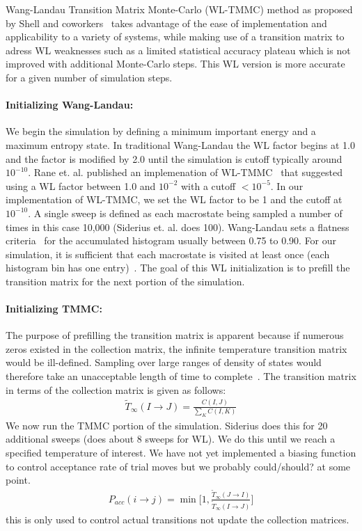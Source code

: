 \documentclass[letterpaper,twocolumn,amsmath,amssymb,pre,aps,10pt]{revtex4-1}
\begin{document}
Wang-Landau Transition Matrix Monte-Carlo (WL-TMMC) method as proposed
by Shell and coworkers~\cite{shell2003improved,shell2004flat} takes
advantage of the ease of implementation and applicability to a variety
of systems, while making use of a transition matrix to adress WL
weaknesses such as a limited statistical accuracy plateau which is not
improved with additional Monte-Carlo steps.  This WL version is more
accurate for a given number of simulation steps.

\paragraph{Initializing Wang-Landau:} We begin the simulation by
defining a minimum important energy and a maximum entropy state. In
traditional Wang-Landau the WL factor begins at 1.0 and the factor is
modified by 2.0 until the simulation is cutoff typically around
$10^{-10}$.  Rane et. al. published an implemenation of
WL-TMMC~\cite{rane2013monte} that suggested using a WL factor between 1.0 and
$10^{-2}$ with a cutoff $<10^{-5}$. In our implementation of WL-TMMC,
we set the WL factor to be 1 and the cutoff at $10^{-10}$. A single
sweep is defined as each macrostate being sampled a number of times in
this case 10,000 (Siderius et. al. does 100). Wang-Landau sets a
flatness criteria~\cite{wang2001determining, wang2001efficient,
hatch2015computational, mahynski2017predicting} for the accumulated
histogram usually between 0.75 to 0.90.  For our simulation, it is
sufficient that each macrostate is visited at least once (each
histogram bin has one entry)~\cite{shell2003improved}.  The goal of
this WL initialization is to prefill the transition matrix for the next
portion of the simulation.
\paragraph{Initializing TMMC:} The purpose of prefilling the transition
matrix is apparent because if numerous zeros existed in the collection
matrix, the infinite temperature transition matrix would be
ill-defined.  Sampling over large ranges of density of states would
therefore take an unacceptable length of time to
complete~\cite{shell2003improved, shen2014elucidating}.  The transition
matrix in terms of the collection matrix is given as follows:
\begin{align}
\widetilde{T}_{\infty}(I\rightarrow J) = \frac{C(I,J)}
{\sum_{K} C(I,K)}
\end{align}
We now run the TMMC portion of the simulation.  Siderius does this for
20 additional sweeps (does about 8 sweeps for WL).  We do this until we
reach a specified temperature of interest.
We have not yet implemented a biasing function to control acceptance
rate of trial moves but we probably could/should? at some point.
\begin{align}
  P_{acc}(i\rightarrow j) = \min\bigg[1,\frac{\widetilde{T}_{\infty}(J\rightarrow I)}
  {\widetilde{T}_{\infty}(I\rightarrow J)}\bigg]
\end{align}
this is only used to control actual transitions not update the collection
matrices.
\end{document}
